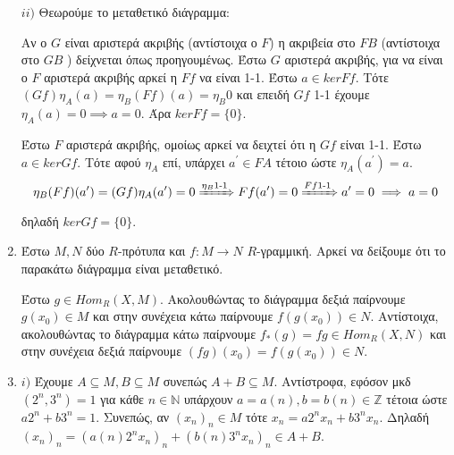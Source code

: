\documentclass{article}
\begin{document}
\begin{enumerate}
	$ii)$ Θεωρούμε το μεταθετικό διάγραμμα:

	\begin{center}
	\end{center}
	
	Αν ο $G$ είναι αριστερά ακριβής (αντίστοιχα ο $F$) η ακριβεία στο $FB$ (αντίστοιχα στο $GB$ ) δείχνεται όπως προηγουμένως. Έστω $G$ αριστερά ακριβής, για να είναι ο $F$ αριστερά ακριβής αρκεί η $Ff$ να είναι 1-1. Έστω $a \in kerFf$. Τότε $ (Gf) \eta_A (a) = \eta_B (Ff)(a) = \eta_B 0 $ και επειδή $Gf$ 1-1 έχουμε $\eta_A (a) = 0 \implies a=0$. Άρα $kerFf = \{0\}$.
	$ $\newline

	Έστω $F$ αριστερά ακριβής, ομοίως αρκεί να δειχτεί ότι η $Gf$ είναι 1-1. Έστω $a \in kerGf$. Τότε αφού $\eta_A$ επί, υπάρχει $a^{\prime} \in FA$ τέτοιο ώστε $\eta_A (a^{\prime}) = a$.
	\[ \eta_B (Ff) (a^{\prime}) = (Gf) \eta_A (a^{\prime}) = 0 \xRightarrow{\eta_B \text{1-1}} Ff(a^{\prime} ) = 0 \xRightarrow{Ff \text{1-1}} a^{\prime} = 0 \implies a =0\]
	δηλαδή $kerGf=\{0\}$.
	$ $\newline


	\item Έστω $M, N$ δύο $R$-πρότυπα και $f: M \rightarrow N$ $R$-γραμμική. Αρκεί να δείξουμε ότι το παρακάτω διάγραμμα είναι μεταθετικό.
		\begin{center}
		\end{center}
		Έστω $g \in Hom_R (X,M)$. Ακολουθώντας το διάγραμμα δεξιά παίρνουμε $g(x_0) \in M$ και στην συνέχεια κάτω παίρνουμε $f(g(x_0)) \in N$. Αντίστοιχα, ακολουθώντας το διάγραμμα κάτω παίρνουμε $f_* (g) = fg \in Hom_R(X,N)$ και στην συνέχεια δεξιά παίρνουμε $(fg)(x_0) = f(g(x_0)) \in N$.
	$ $\newline

\item $i)$ Έχουμε $A \subseteq M, B \subseteq M$ συνεπώς $A+B \subseteq M$. Αντίστροφα, εφόσον μκδ$(2^n , 3^n) = 1$ για κάθε $n \in \mathbb{N}$ υπάρχουν $a=a(n),b=b(n) \in \mathbb{Z}$ τέτοια ώστε $a 2^n + b 3^n = 1$. Συνεπώς, αν $(x_n)_n \in M$ τότε $x_n = a 2^n x_n + b 3^n x_n$. Δηλαδή $(x_n)_n = \left( a(n) 2^n x_n  \right)_n + \left( b(n) 3^n x_n \right)_n \in A+B$.
	$ $\newline


\end{enumerate}
\end{document}
